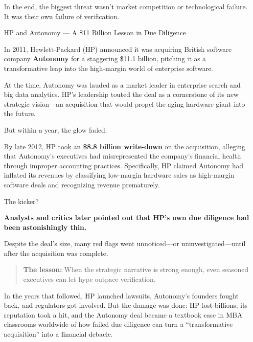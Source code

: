 In the end, the biggest threat wasn’t market competition or technological failure.
It was their own failure of verification.

\medskip

\begin{HistoricalSidebar}{HP and Autonomy --- A \$11 Billion Lesson in Due Diligence}

    In 2011, Hewlett-Packard (HP) announced it was acquiring British software company \textbf{Autonomy} for a staggering \$11.1 billion, pitching it as a transformative leap into the high-margin world of enterprise software.

    \medskip
    
    At the time, Autonomy was lauded as a market leader in enterprise search and big data analytics. HP’s leadership touted the deal as a cornerstone of its new strategic vision—an acquisition that would propel the aging hardware giant into the future.

    \medskip
    
    But within a year, the glow faded.
    
    \medskip
    
    By late 2012, HP took an \textbf{\$8.8 billion write-down} on the acquisition, alleging that Autonomy’s executives had misrepresented the company’s financial health through improper accounting practices.
    Specifically, HP claimed Autonomy had inflated its revenues by classifying low-margin hardware sales as high-margin software deals and recognizing revenue prematurely.
    
    \medskip
    
    The kicker?

    \medskip
    
    \textbf{Analysts and critics later pointed out that HP’s own due diligence had been astonishingly thin.}

    \medskip

    Despite the deal’s size, many red flags went unnoticed—or uninvestigated—until after the acquisition was complete.
    
    \begin{quote}
    \textbf{The lesson:} When the strategic narrative is strong enough, even seasoned executives can let hype outpace verification.
    \end{quote}
    
    In the years that followed, HP launched lawsuits, Autonomy’s founders fought back, and regulators got involved. But the damage was done:
    HP lost billions, its reputation took a hit, and the Autonomy deal became a textbook case in MBA classrooms worldwide of how failed due diligence can turn a “transformative acquisition” into a financial debacle.
    
\end{HistoricalSidebar}

